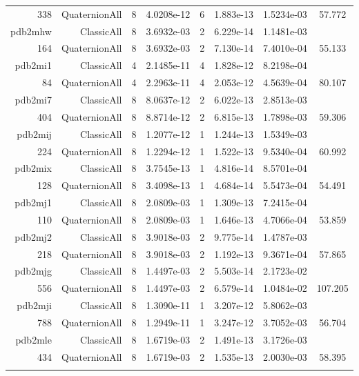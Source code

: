 \begin{xltabular}{\textwidth}{r|rcS[table-format=1.4e+2]cS[table-format=1.3e+2]S[table-format=1.4e+2]S[table-format=-1.3]}
338 & QuaternionAll & 8 & 4.0208e-12 & 6 & 1.883e-13 & 1.5234e-03 & 57.772\\  \addlinespace
pdb2mhw & ClassicAll & 8 & 3.6932e-03 & 2 & 6.229e-14 & 1.1481e-03 & \\
164 & QuaternionAll & 8 & 3.6932e-03 & 2 & 7.130e-14 & 7.4010e-04 & 55.133\\  \addlinespace
pdb2mi1 & ClassicAll & 4 & 2.1485e-11 & 4 & 1.828e-12 & 8.2198e-04 & \\
84 & QuaternionAll & 4 & 2.2963e-11 & 4 & 2.053e-12 & 4.5639e-04 & 80.107\\  \addlinespace
pdb2mi7 & ClassicAll & 8 & 8.0637e-12 & 2 & 6.022e-13 & 2.8513e-03 & \\
404 & QuaternionAll & 8 & 8.8714e-12 & 2 & 6.815e-13 & 1.7898e-03 & 59.306\\  \addlinespace
pdb2mij & ClassicAll & 8 & 1.2077e-12 & 1 & 1.244e-13 & 1.5349e-03 & \\
224 & QuaternionAll & 8 & 1.2294e-12 & 1 & 1.522e-13 & 9.5340e-04 & 60.992\\  \addlinespace
pdb2mix & ClassicAll & 8 & 3.7545e-13 & 1 & 4.816e-14 & 8.5701e-04 & \\
128 & QuaternionAll & 8 & 3.4098e-13 & 1 & 4.684e-14 & 5.5473e-04 & 54.491\\  \addlinespace
pdb2mj1 & ClassicAll & 8 & 2.0809e-03 & 1 & 1.309e-13 & 7.2415e-04 & \\
110 & QuaternionAll & 8 & 2.0809e-03 & 1 & 1.646e-13 & 4.7066e-04 & 53.859\\  \addlinespace
pdb2mj2 & ClassicAll & 8 & 3.9018e-03 & 2 & 9.775e-14 & 1.4787e-03 & \\
218 & QuaternionAll & 8 & 3.9018e-03 & 2 & 1.192e-13 & 9.3671e-04 & 57.865\\  \addlinespace
pdb2mjg & ClassicAll & 8 & 1.4497e-03 & 2 & 5.503e-14 & 2.1723e-02 & \\
556 & QuaternionAll & 8 & 1.4497e-03 & 2 & 6.579e-14 & 1.0484e-02 & 107.205\\  \addlinespace
pdb2mji & ClassicAll & 8 & 1.3090e-11 & 1 & 3.207e-12 & 5.8062e-03 & \\
788 & QuaternionAll & 8 & 1.2949e-11 & 1 & 3.247e-12 & 3.7052e-03 & 56.704\\  \addlinespace
pdb2mle & ClassicAll & 8 & 1.6719e-03 & 2 & 1.491e-13 & 3.1726e-03 & \\
434 & QuaternionAll & 8 & 1.6719e-03 & 2 & 1.535e-13 & 2.0030e-03 & 58.395\\  \addlinespace

\end{xltabular}
